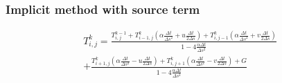 \documentclass[xcolor=dvipsnames,10pt,aspectratio=169]{beamer}
\begin{document}
\begin{frame}
	\frametitle{Implicit method with source term}
	\begin{equation}
		\begin{split}
		T_{i,j}^{k} = \frac{T_{i,j}^{k-1} + T_{i -1, j}^{k} \left( \alpha \frac{\Delta t}{\Delta s^2} + u \frac{\Delta t}{2 \Delta s} \right) 	+ T_{i,j-1}^{k} \left( \alpha \frac{\Delta t}{\Delta s^2} + v \frac{\Delta t}{2 \Delta s} \right)}{ 1 - 4 \frac{\alpha \Delta t}{\Delta s ^2}} \\
		+ \frac{  T_{i+1,j}^{k} \left( \alpha \frac{\Delta t}{ \Delta s^2} - u \frac{\Delta t}{2 \Delta s}\right)
		+  T_{i,j+1}^{k} \left( \alpha \frac{\Delta t}{\Delta s^2} - v \frac{\Delta t}{2 \Delta s}\right) + G}{ 1 - 4 \frac{\alpha \Delta t}{\Delta s ^2}}
		\end{split}
	\end{equation}
\end{frame}
\end{document}
